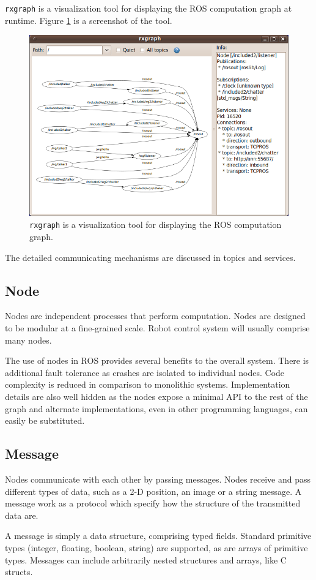 \documentclass[a4paper, 10pt, conference]{ieeeconf}       %
\begin{document}
\texttt{rxgraph} is a visualization tool for displaying the ROS computation graph at runtime. Figure \ref{fig:rxgraph} is a screenshot of the tool.

\begin{figure}[htpb]
  \centering
  \includegraphics[width=.48\textwidth]{rxgraph}
  \caption{\texttt{rxgraph} is a visualization tool for displaying the ROS computation graph.}
  \label{fig:rxgraph}
\end{figure}

The detailed communicating mechanisms are discussed in topics and services.

\subsection{Node}

Nodes are independent processes that perform computation. Nodes are designed to be modular at a fine-grained scale. Robot control system will usually comprise many nodes.

The use of nodes in ROS provides several benefits to the overall system. There is additional fault tolerance as crashes are isolated to individual nodes. Code complexity is reduced in comparison to monolithic systems. Implementation details are also well hidden as the nodes expose a minimal API to the rest of the graph and alternate implementations, even in other programming languages, can easily be substituted. 

\subsection{Message}

Nodes communicate with each other by passing messages. Nodes receive and pass different types of data, such as a 2-D position, an image or a string message. A message work as a protocol which specify how the structure of the transmitted data are.

A message is simply a data structure, comprising typed fields. Standard primitive types (integer, floating, boolean, string) are supported, as are arrays of primitive types. Messages can include arbitrarily nested structures and arrays, like C structs.
\end{document}
